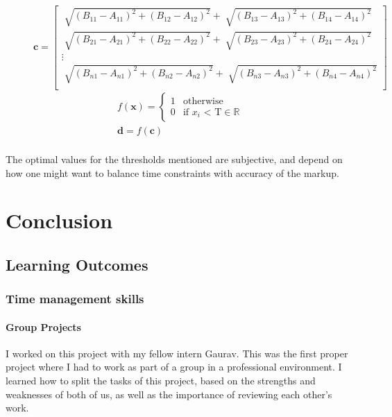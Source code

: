     \begin{figure}[h]
        \centering
        
        \[
        \pmb{c}=
        \begin{bmatrix}
            \sqrt[]{{(B_{11} - A_{11})}^2 + {(B_{12} - A_{12})}^2} + \sqrt[]{{(B_{13} - A_{13})}^2 + {(B_{14} - A_{14})}^2} \\
            \sqrt[]{{(B_{21} - A_{21})}^2 + {(B_{22} - A_{22})}^2} + \sqrt[]{{(B_{23} - A_{23})}^2 + {(B_{24} - A_{24})}^2} \\
            \vdots \\
            \sqrt[]{{(B_{n1} - A_{n1})}^2 + {(B_{n2} - A_{n2})}^2} + \sqrt[]{{(B_{n3} - A_{n3})}^2 + {(B_{n4} - A_{n4})}^2} \\
        \end{bmatrix}
        \]
        \begin{gather*}
            f(\pmb{x})=
        \begin{cases}
        1      & \text{otherwise}\\
        0      & \text{if $x_i$ < T} \in \mathbb{R} 
        \end{cases} \\
        \pmb{d} = f(\pmb{c}) \\
        \end{gather*}
        \caption{}
        \label{fig:ROIprocessing}
    \end{figure} 

    The optimal values for the thresholds mentioned are subjective, and depend on how one might want to balance time constraints with accuracy of the markup.


\section{Conclusion}
    \subsection{Learning Outcomes}
    \subsubsection{Time management skills}
            \paragraph{Group Projects}
            I worked on this project with my fellow intern Gaurav. This was the first proper project where I had to work as part of a group in a professional environment. I learned how to split the tasks of this project, based on the strengths and weaknesses of both of us, as well as the importance of reviewing each other's work.
